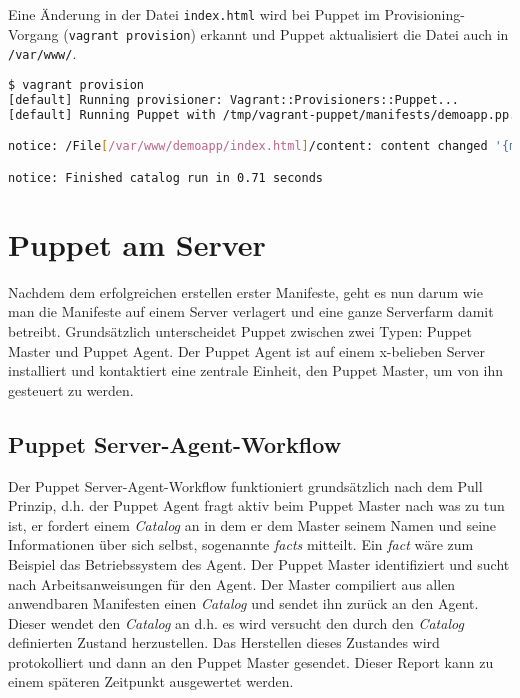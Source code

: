 \documentclass[12pt,a4paper,ngerman]{article}
\begin{document}
Eine Änderung in der Datei \lstinline$index.html$ wird bei Puppet im Provisioning-Vorgang (\lstinline$vagrant provision$) erkannt und Puppet aktualisiert die Datei auch in \lstinline$/var/www/$.
\begin{lstlisting}[language=sh,caption=Puppet Provisioning nach Änderung von index.html, label=provisionapp]
$ vagrant provision
[default] Running provisioner: Vagrant::Provisioners::Puppet...
[default] Running Puppet with /tmp/vagrant-puppet/manifests/demoapp.pp...

notice: /File[/var/www/demoapp/index.html]/content: content changed '{md5}90a8d419b9c7b43b09ba73abebaf8f4c' to '{md5}0a4ee5bb63c3e5c29cc54cf36a4be23c'

notice: Finished catalog run in 0.71 seconds
\end{lstlisting}

\section{Puppet am Server}

Nachdem dem erfolgreichen erstellen erster Manifeste, geht es nun darum wie man die Manifeste auf einem Server verlagert und eine ganze Serverfarm damit betreibt. Grundsätzlich unterscheidet Puppet zwischen zwei Typen: Puppet Master und Puppet Agent. Der Puppet Agent ist auf einem x-belieben Server installiert und kontaktiert eine zentrale Einheit, den Puppet Master, um von ihn gesteuert zu werden. 

\subsection{Puppet Server-Agent-Workflow}

Der Puppet Server-Agent-Workflow funktioniert grundsätzlich nach dem Pull Prinzip, d.h. der Puppet Agent fragt aktiv beim Puppet Master nach was zu tun ist, er fordert einem \textit{Catalog} an in dem er dem Master seinem Namen und seine Informationen über sich selbst, sogenannte \textit{facts} mitteilt. Ein \textit{fact} wäre zum Beispiel das Betriebssystem des Agent. Der Puppet Master identifiziert und sucht nach Arbeitsanweisungen für den Agent. Der Master compiliert aus allen anwendbaren Manifesten einen \textit{Catalog} und sendet ihn zurück an den Agent. Dieser wendet den \textit{Catalog} an d.h. es wird versucht den durch den \textit{Catalog} definierten Zustand herzustellen. Das Herstellen dieses Zustandes wird protokolliert und dann an den Puppet Master gesendet. Dieser Report kann zu einem späteren Zeitpunkt ausgewertet werden.
\end{document}
